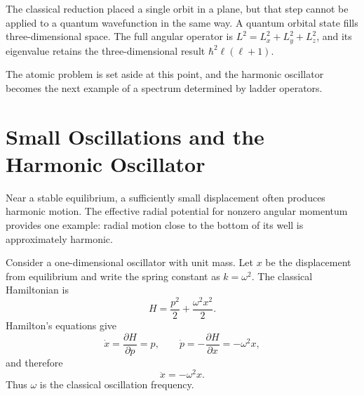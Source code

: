 The classical reduction placed a single orbit in a plane, but that step cannot be applied to a quantum wavefunction in the same way. A quantum orbital state fills three-dimensional space. The full angular operator is \(L^2=L_x^2+L_y^2+L_z^2\), and its eigenvalue retains the three-dimensional result \(\hbar^2\ell(\ell+1)\).

\begin{classroomqa}
\end{classroomqa}

\begin{classroomqa}
\end{classroomqa}

The atomic problem is set aside at this point, and the harmonic oscillator becomes the next example of a spectrum determined by ladder operators.

\section{Small Oscillations and the Harmonic Oscillator}

Near a stable equilibrium, a sufficiently small displacement often produces harmonic motion. The effective radial potential for nonzero angular momentum provides one example: radial motion close to the bottom of its well is approximately harmonic.

Consider a one-dimensional oscillator with unit mass. Let \(x\) be the displacement from equilibrium and write the spring constant as \(k=\omega^2\). The classical Hamiltonian is
\begin{equation}
H=\frac{p^2}{2}+\frac{\omega^2x^2}{2}.
\end{equation}
Hamilton's equations give
\begin{equation}
\dot{x}=\frac{\partial H}{\partial p}=p,
\qquad
\dot{p}=-\frac{\partial H}{\partial x}=-\omega^2x,
\end{equation}
and therefore
\begin{equation}
\ddot{x}=-\omega^2x.
\end{equation}
Thus \(\omega\) is the classical oscillation frequency.

